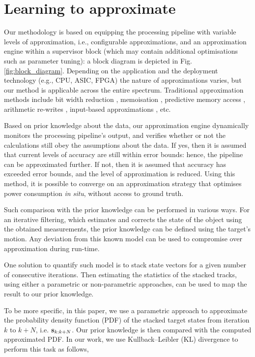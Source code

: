 \section{Learning to approximate}\label{learning}

Our methodology is based on equipping the processing pipeline with variable levels of approximation, i.e., configurable approximations, and an approximation engine within a supervisor block (which may contain additional optimisations such as parameter tuning): a block diagram is depicted in Fig. \ref{fig:block_diagram}. Depending on the application and the deployment technology (e.g., CPU, ASIC, FPGA) the nature of approximations varies, but our method is applicable across the entire spectrum. Traditional approximation methods include bit width reduction \cite{mittal2016survey}, memoisation \cite{sinha2016low}, predictive memory access \cite{yazdanbakhsh2016mitigating}, arithmetic re-writes \cite{nepal2016automated}, input-based approximations \cite{raha2016input}, etc.
\par Based on prior knowledge about the data, our approximation engine dynamically monitors the processing pipeline's output, and verifies whether or not the calculations still obey the assumptions about the data. If yes, then it is assumed that current levels of accuracy are still within error bounds: hence, the pipeline can be approximated further. If not, then it is assumed that accuracy has exceeded error bounds, and the level of approximation is reduced. Using this method, it is possible to converge on an approximation strategy that optimises power consumption \textit{in situ}, without access to ground truth. 

\par Such comparison with the prior knowledge can be performed in various ways. 
For an iterative filtering, which estimates and corrects the state of the object using the obtained measurements, the prior knowledge can be defined using the target's motion. Any deviation from this known model can be used to compromise over approximation during run-time. 

One solution to quantify such model is to stack state vectors for a given number of consecutive iterations. Then estimating the statistics of the stacked tracks, using either a parametric or non-parametric approaches, can be used to map the result to our prior knowledge. 

To be more specific, in this paper, we use a parametric approach to approximate the probability density function (PDF) of the stacked target states from iteration $k$ to $k+N$, i.e. ${\bf s}_{k:k+N}$. 
Our prior knowledge is then compared with the computed approximated PDF. In our work, we use Kullback–Leibler (KL) divergence to perform this task as follows,

